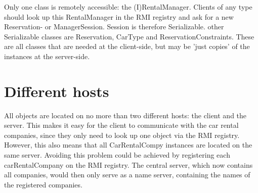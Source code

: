 \documentclass[10pt]{article}
\begin{document}
Only one class is remotely accessible: the (I)RentalManager. Clients of any type should look up this RentalManager in the RMI registry and ask for a new Reservation- or ManagerSession. Session is therefore Serializable. other Serializable classes are Reservation, CarType and ReservationConstraints. These are all classes that are needed at the client-side, but may be 'just copies' of the instances at the server-side.

\section{Different hosts}

All objects are located on no more than two different hosts: the client and the server. This makes it easy for the client to communicate with the car rental companies, since they only need to look up one object via the RMI registry. However, this also means that all CarRentalCompy instances are located on the same server. Avoiding this problem could be achieved by registering each carRentalCompany on the RMI registry. The central server, which now contains all companies, would then only serve as a name server, containing the names of the registered companies.
\end{document}
